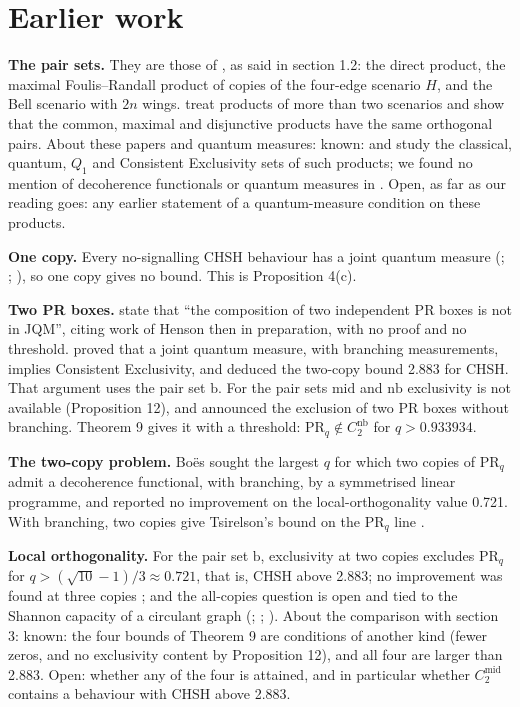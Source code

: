 \documentclass[11pt,a4paper]{article}
\theoremstyle{definition}
\theoremstyle{remark}
\newcommand{\PR}{\mathrm{PR}}
\newcommand{\nb}{\mathrm{nb}}
\newcommand{\md}{\mathrm{mid}}
\newcommand{\br}{\mathrm{b}}
\begin{document}
\section{Earlier work}

\noindent\textbf{The pair sets.} They are those of \cite{AFLS}, as said in section 1.2: the direct product, the maximal Foulis--Randall product of copies of the four-edge scenario $H$, and the Bell scenario with $2n$ wings. \cite{SW} treat products of more than two scenarios and show that the common, maximal and disjunctive products have the same orthogonal pairs. About these papers and quantum measures: known: \cite{AFLS} and \cite{SW} study the classical, quantum, $Q_1$ and Consistent Exclusivity sets of such products; we found no mention of decoherence functionals or quantum measures in \cite{AFLS}. Open, as far as our reading goes: any earlier statement of a quantum-measure condition on these products.

\medskip
\noindent\textbf{One copy.} Every no-signalling CHSH behaviour has a joint quantum measure (\cite[Theorem 2]{BDR}; \cite[Section V]{CDH+}; \cite{DHW}), so one copy gives no bound. This is Proposition 4(c).

\medskip
\noindent\textbf{Two PR boxes.} \cite{DHW} state that ``the composition of two independent PR boxes is not in JQM'', citing work of Henson then in preparation, with no proof and no threshold. \cite{H15} proved that a joint quantum measure, with branching measurements, implies Consistent Exclusivity, and deduced the two-copy bound 2.883 for CHSH. That argument uses the pair set $\br$. For the pair sets $\md$ and $\nb$ exclusivity is not available (Proposition 12), and \cite[Remark 15]{R7} announced the exclusion of two PR boxes without branching. Theorem 9 gives it with a threshold: $\PR_q \notin C_2^{\nb}$ for $q > 0.933934$.

\medskip
\noindent\textbf{The two-copy problem.} Bo\"es \cite[Section 6.3]{B14} sought the largest $q$ for which two copies of $\PR_q$ admit a decoherence functional, with branching, by a symmetrised linear programme, and reported no improvement on the local-orthogonality value 0.721. With branching, two copies give Tsirelson's bound on the $\PR_q$ line \cite{TC}.

\medskip
\noindent\textbf{Local orthogonality.} For the pair set $\br$, exclusivity at two copies excludes $\PR_q$ for $q > (\sqrt{10} - 1)/3 \approx 0.721$, that is, CHSH above 2.883; no improvement was found at three copies \cite{SFA+}; and the all-copies question is open and tied to the Shannon capacity of a circulant graph (\cite{SFA+}; \cite{FSA+}; \cite{C13}). About the comparison with section 3: known: the four bounds of Theorem 9 are conditions of another kind (fewer zeros, and no exclusivity content by Proposition 12), and all four are larger than 2.883. Open: whether any of the four is attained, and in particular whether $C_2^{\md}$ contains a behaviour with CHSH above 2.883.
\end{document}
